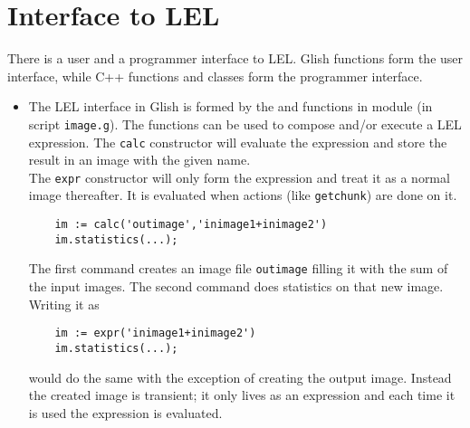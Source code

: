 \section{\label{LEL:GLISHC}Interface to LEL}
There is a user and a programmer interface to LEL.
Glish functions form the user interface, while C++ functions
and classes form the programmer interface.
\begin{itemize}
\item
  The LEL interface in Glish is formed by the
   and
   functions in module
   (in script \texttt{image.g}).
  The functions can be used
  to compose and/or execute a LEL expression.
  The \texttt{calc} constructor will evaluate the expression and store
  the result in an image with the given name.
  \\The \texttt{expr} constructor will only form the expression and
  treat it as a normal image thereafter.
  It is evaluated when actions (like \texttt{getchunk}) are done on it.
  \begin{verbatim}
    im := calc('outimage','inimage1+inimage2')
    im.statistics(...);
  \end{verbatim}
  The first command creates an image file \texttt{outimage} filling
  it with the sum of the input images. The second command does
  statistics on that new image.
  \\Writing it as
  \begin{verbatim}
    im := expr('inimage1+inimage2')
    im.statistics(...);
  \end{verbatim}
  would do the same with the exception of creating the output image.
  Instead the created image is transient; it only lives as an
  expression and each time it is used the expression is evaluated.


\end{itemize}
